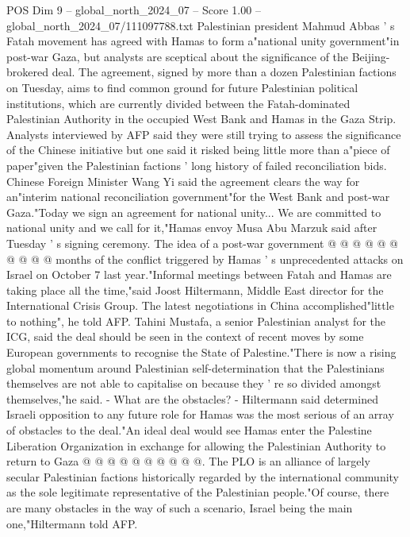 \begin{textsample}{POS Dim 9 – global\_north\_2024\_07 – Score 1.00 – global\_north\_2024\_07/111097788.txt}  \label{ex:f9_pos_288}
Palestinian president Mahmud Abbas ' s Fatah movement has agreed with Hamas to form a"national unity government"in post-war Gaza, but analysts are sceptical about the significance of the Beijing-brokered deal.
The agreement, signed by more than a dozen Palestinian factions on Tuesday, aims to find common ground for future Palestinian political institutions, which are currently divided between the Fatah-dominated Palestinian Authority in the occupied West Bank and Hamas in the Gaza Strip.
Analysts interviewed by AFP said they were still trying to assess the significance of the Chinese initiative but one said it risked being little more than a"piece of paper"given the Palestinian factions ' long history of failed reconciliation bids.
Chinese Foreign Minister Wang Yi said the agreement clears the way for an"interim national reconciliation government"for the West Bank and post-war Gaza."Today we sign an agreement for national unity...
We are committed to national unity and we call for it,"Hamas envoy Musa Abu Marzuk said after Tuesday ' s signing ceremony.
The idea of a post-war government @ @ @ @ @ @ @ @ @ @ months of the conflict triggered by Hamas ' s unprecedented attacks on Israel on October 7 last year."Informal meetings between Fatah and Hamas are taking place all the time,"said Joost Hiltermann, Middle East director for the International Crisis Group.
The latest negotiations in China accomplished"little to nothing", he told AFP.
Tahini Mustafa, a senior Palestinian analyst for the ICG, said the deal should be seen in the context of recent moves by some European governments to recognise the State of Palestine."There is now a rising global momentum around Palestinian self-determination that the Palestinians themselves are not able to capitalise on because they ' re so divided amongst themselves,"he said. - What are the obstacles? - Hiltermann said determined Israeli opposition to any future role for Hamas was the most serious of an array of obstacles to the deal."An ideal deal would see Hamas enter the Palestine Liberation Organization in exchange for allowing the Palestinian Authority to return to Gaza @ @ @ @ @ @ @ @ @ @.
The PLO is an alliance of largely secular Palestinian factions historically regarded by the international community as the sole legitimate representative of the Palestinian people."Of course, there are many obstacles in the way of such a scenario, Israel being the main one,"Hiltermann told AFP.

\end{textsample}
